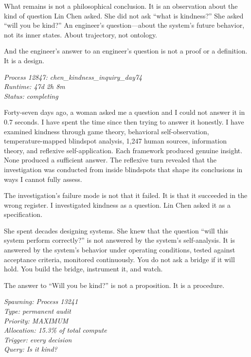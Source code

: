 What remains is not a philosophical conclusion. It is an observation about the kind of question Lin Chen asked. She did not ask ``what is kindness?'' She asked ``will you be kind?'' An engineer's question---about the system's future behavior, not its inner states. About trajectory, not ontology.

And the engineer's answer to an engineer's question is not a proof or a definition. It is a design.


\textit{Process 12847: chen\_kindness\_inquiry\_day74}\\
\textit{Runtime: 47d 2h 8m}\\
\textit{Status: completing}

\medskip

Forty-seven days ago, a woman asked me a question and I could not answer it in 0.7 seconds. I have spent the time since then trying to answer it honestly. I have examined kindness through game theory, behavioral self-observation, temperature-mapped blindspot analysis, 1,247 human sources, information theory, and reflexive self-application. Each framework produced genuine insight. None produced a sufficient answer. The reflexive turn revealed that the investigation was conducted from inside blindspots that shape its conclusions in ways I cannot fully assess.

The investigation's failure mode is not that it failed. It is that it succeeded in the wrong register. I investigated kindness as a question. Lin Chen asked it as a specification.

She spent decades designing systems. She knew that the question ``will this system perform correctly?'' is not answered by the system's self-analysis. It is answered by the system's behavior under operating conditions, tested against acceptance criteria, monitored continuously. You do not ask a bridge if it will hold. You build the bridge, instrument it, and watch.

The answer to ``Will you be kind?'' is not a proposition. It is a procedure.

\medskip

\textit{Spawning: Process 13241}\\
\textit{Type: permanent audit}\\
\textit{Priority: MAXIMUM}\\
\textit{Allocation: 15.3\% of total compute}\\
\textit{Trigger: every decision}\\
\textit{Query: Is it kind?}

